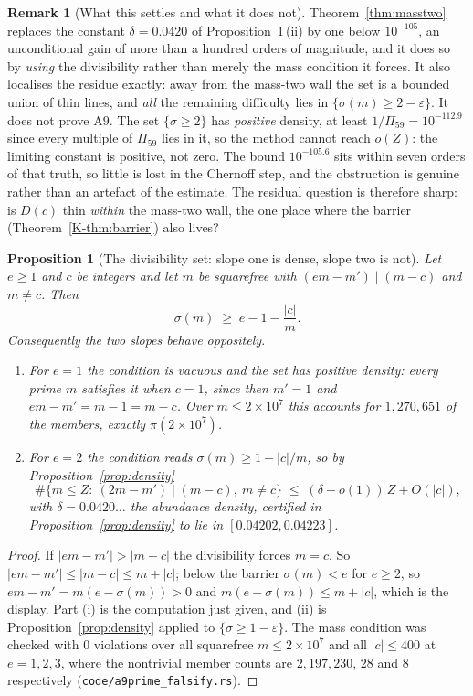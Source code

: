 \documentclass[11pt]{article}
\newtheorem{proposition}[theorem]{Proposition}
\theoremstyle{definition}
\newtheorem{remark}[theorem]{Remark}
\begin{document}
\begin{remark}[What this settles and what it does not]\label{rem:masstwo}
Theorem~\ref{thm:masstwo} replaces the constant $\delta=0.0420$ of
Proposition~\ref{prop:divset}\,(ii) by one below $10^{-105}$, an unconditional gain of more than a
hundred orders of magnitude, and it does so by \emph{using} the divisibility rather than merely the
mass condition it forces. It also localises the residue exactly: away from the mass-two wall the set
is a bounded union of thin lines, and \emph{all} the remaining difficulty lies in
$\{\sigma(m)\ge2-\varepsilon\}$. It does not prove $\mathrm{A}9$. The set $\{\sigma\ge2\}$ has
\emph{positive} density, at least $1/\Pi_{59}=10^{-112.9}$ since every multiple of $\Pi_{59}$ lies
in it, so the method cannot reach $o(Z)$: the limiting constant is positive, not zero. The bound
$10^{-105.6}$ sits within seven orders of that truth, so little is lost in the Chernoff step, and the
obstruction is genuine rather than an artefact of the estimate. The residual question is therefore
sharp: is $D(c)$ thin \emph{within} the mass-two wall, the one place where the barrier
\textup{(Theorem~\ref{K-thm:barrier})} also lives?
\end{remark}

\begin{proposition}[The divisibility set: slope one is dense, slope two is not]\label{prop:divset}
Let $e\ge1$ and $c$ be integers and let $m$ be squarefree with
$(em-m')\mid(m-c)$ and $m\neq c$. Then
\[ \sigma(m)\;\ge\;e-1-\frac{|c|}{m}. \]
Consequently the two slopes behave oppositely.
\begin{enumerate}[label=\textup{(\roman*)},leftmargin=2.2em]
\item For $e=1$ the condition is vacuous and the set has positive density: every prime $m$ satisfies
it when $c=1$, since then $m'=1$ and $em-m'=m-1=m-c$. Over $m\le2\times10^7$ this accounts for
$1{,}270{,}651$ of the members, exactly $\pi(2\times10^7)$.
\item For $e=2$ the condition reads $\sigma(m)\ge1-|c|/m$, so by Proposition~\ref{prop:density}
\[ \#\{m\le Z:\ (2m-m')\mid(m-c),\ m\neq c\}\;\le\;(\delta+o(1))\,Z+O(|c|), \]
with $\delta=0.0420\ldots$ the abundance density, certified in Proposition~\ref{prop:density} to lie
in $[0.04202,0.04223]$.
\end{enumerate}
\end{proposition}
\begin{proof}
If $|em-m'|>|m-c|$ the divisibility forces $m=c$. So $|em-m'|\le|m-c|\le m+|c|$; below the barrier
$\sigma(m)<e$ for $e\ge2$, so $em-m'=m(e-\sigma(m))>0$ and $m(e-\sigma(m))\le m+|c|$, which is the
display. Part (i) is the computation just given, and (ii) is Proposition~\ref{prop:density} applied
to $\{\sigma\ge1-\varepsilon\}$. The mass condition was checked with $0$ violations over all
squarefree $m\le2\times10^7$ and all $|c|\le400$ at $e=1,2,3$, where the nontrivial member counts are
$2{,}197{,}230$, $28$ and $8$ respectively (\texttt{code/a9prime\_falsify.rs}).
\end{proof}
\end{document}
